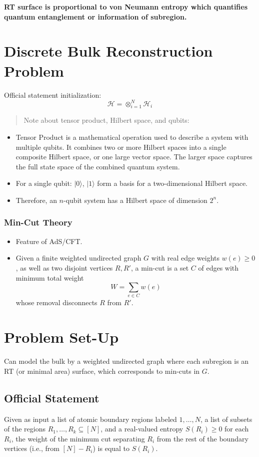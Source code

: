 \documentclass{article}
\begin{document}
\textbf{RT surface is proportional to von Neumann entropy which quantifies quantum entanglement or information of subregion.}

\section{Discrete Bulk Reconstruction Problem}
Official statement initialization:
\[
\mathcal{H} = \otimes^{N}_{i=1}\mathcal{H}_{i}
\]
\begin{quote}
    Note about tensor product, Hilbert space, and qubits:
\end{quote}
\begin{itemize}
    \item Tensor Product is a mathematical operation used to describe a system with multiple qubits. It combines two or more Hilbert spaces into a single composite Hilbert space, or one large vector space. The larger space captures the full state space of the combined quantum system.
    \item For a single qubit: $|0\rangle$, $|1\rangle$ form a basis for a two-dimensional Hilbert space.
    \item Therefore, an $n$-qubit system has a Hilbert space of dimension $2^n$.
\end{itemize}

\subsubsection*{Min-Cut Theory}
\begin{itemize}
    \item Feature of AdS/CFT.
    \item Given a finite weighted undirected graph \( G \) with real edge weights \( w(e) \geq 0 \), as well as two disjoint vertices \( R, R' \), a min-cut is a set \( C \) of edges with minimum total weight
    \[
    W = \sum_{e \in C} w(e)
    \]
    whose removal disconnects \( R \) from \( R' \).
\end{itemize}

\section{Problem Set-Up}
Can model the bulk by a weighted undirected graph where each subregion is an RT (or minimal area) surface, which corresponds to min-cuts in \( G \).

\subsection{Official Statement}
Given as input a list of atomic boundary regions labeled \( 1, \dots, N \), a list of subsets of the regions \( R_1, \dots, R_k \subseteq [N] \), and a real-valued entropy \( S(R_i) \geq 0 \) for each \( R_i \), the weight of the minimum cut separating \( R_i \) from the rest of the boundary vertices (i.e., from \( [N] - R_i \)) is equal to \( S(R_i) \).
\end{document}
